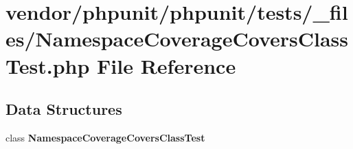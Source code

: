 \section{vendor/phpunit/phpunit/tests/\+\_\+files/\+Namespace\+Coverage\+Covers\+Class\+Test.php File Reference}
\label{phpunit_2tests_2__files_2_namespace_coverage_covers_class_test_8php}
\subsection*{Data Structures}
\begin{DoxyCompactItemize}
\item 
class {\bf Namespace\+Coverage\+Covers\+Class\+Test}
\end{DoxyCompactItemize}

